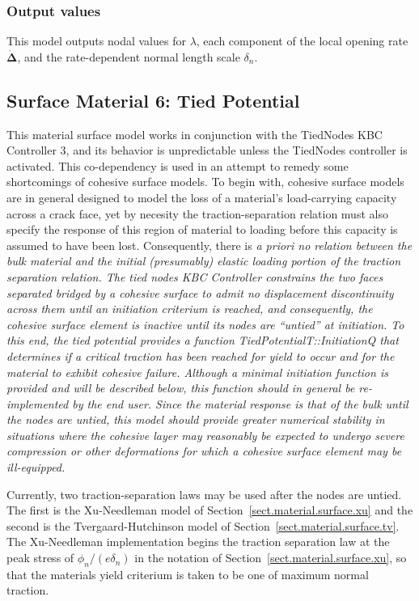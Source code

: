 \subsubsection{Output values}
This model outputs nodal values for $\lambda$, each component of the local opening
rate $\mathbf{\dot{\Delta}}$, and the rate-dependent normal length scale $\delta_n$.

\subsection{Surface Material 6: Tied Potential}
\label{sect.material.surface.tied}

This material surface model works in conjunction with the TiedNodes 
KBC Controller 3, and
its behavior is unpredictable unless the TiedNodes controller
is activated. This co-dependency is used in an attempt to
remedy some shortcomings of cohesive surface models. To begin with,
cohesive surface models are in general designed to model the loss of a 
material's load-carrying capacity across a crack face, yet by necesity
the traction-separation relation must also specify the response of this
region of material to loading before this capacity is assumed to have
been lost. Consequently, there is \it a priori \rm no relation between
the bulk material and the initial (presumably) elastic loading portion
of the traction separation relation. The tied nodes KBC Controller constrains
the two faces separated bridged by a cohesive surface to admit no
displacement discontinuity across them until an initiation criterium is
reached, and consequently, the cohesive surface element is inactive until 
its nodes are ``untied'' at initiation. To this end,
the tied potential provides a function 
TiedPotentialT::InitiationQ that 
determines if a critical traction has been reached for yield to occur
and for the material to exhibit cohesive failure. Although a minimal
initiation function is provided and will be described below, this 
function should in general be re-implemented by the end user. Since
the material response is that of the bulk until the nodes are untied,
this model should provide greater numerical stability in situations where
the cohesive layer may reasonably be expected to undergo severe compression
or other deformations for which a cohesive surface element may be 
ill-equipped. 

Currently, two traction-separation laws may be used after the nodes
are untied. The first is the Xu-Needleman model of 
Section~\ref{sect.material.surface.xu} and the second is the 
Tvergaard-Hutchinson model of Section~\ref{sect.material.surface.tv}. The
Xu-Needleman implementation begins the traction separation law at the peak
stress of $\phi_n/(e \delta_n)$ in the notation of 
Section~\ref{sect.material.surface.xu}, so that the materials yield
criterium is taken to be one of maximum normal traction. 

